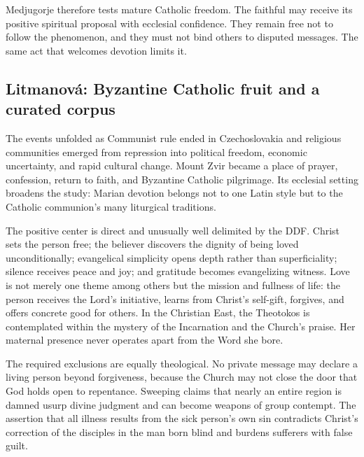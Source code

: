Medjugorje therefore tests mature Catholic freedom. The faithful may receive its positive spiritual proposal with ecclesial confidence. They remain free not to follow the phenomenon, and they must not bind others to disputed messages. The same act that welcomes devotion limits it.

\subsection{Litmanová: Byzantine Catholic fruit and a curated corpus}


The events unfolded as Communist rule ended in Czechoslovakia and religious communities emerged from repression into political freedom, economic uncertainty, and rapid cultural change. Mount Zvir became a place of prayer, confession, return to faith, and Byzantine Catholic pilgrimage. Its ecclesial setting broadens the study: Marian devotion belongs not to one Latin style but to the Catholic communion's many liturgical traditions.

The positive center is direct and unusually well delimited by the DDF\@. Christ sets the person free; the believer discovers the dignity of being loved unconditionally; evangelical simplicity opens depth rather than superficiality; silence receives peace and joy; and gratitude becomes evangelizing witness. Love is not merely one theme among others but the mission and fullness of life: the person receives the Lord's initiative, learns from Christ's self-gift, forgives, and offers concrete good for others. In the Christian East, the Theotokos is contemplated within the mystery of the Incarnation and the Church's praise. Her maternal presence never operates apart from the Word she bore.

The required exclusions are equally theological. No private message may declare a living person beyond forgiveness, because the Church may not close the door that God holds open to repentance. Sweeping claims that nearly an entire region is damned usurp divine judgment and can become weapons of group contempt. The assertion that all illness results from the sick person's own sin contradicts Christ's correction of the disciples in the man born blind and burdens sufferers with false guilt.

